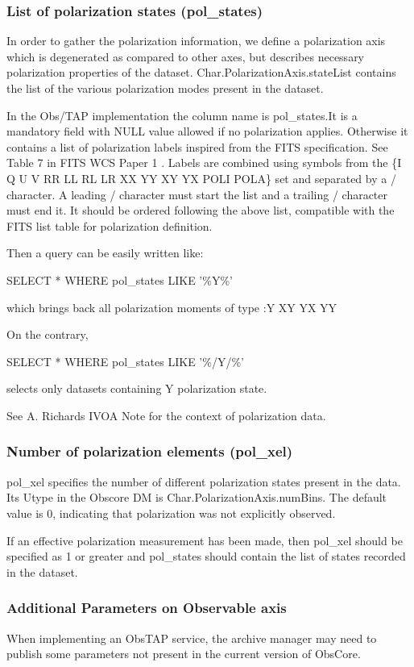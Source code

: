 \documentclass[11pt,a4paper]{ivoa}
\begin{document}
\subsubsection{List of polarization states (pol\_states)}
In order to gather the polarization information, we define a polarization axis which is degenerated as compared to other
axes, but describes necessary polarization properties of the dataset. Char.PolarizationAxis.stateList contains the list
of the various polarization modes present in the dataset. 

In the Obs/TAP implementation the column name is pol\_states.It is a mandatory field with NULL value allowed if no
polarization applies. Otherwise it contains a list of polarization labels inspired from the FITS specification. See
Table 7 in FITS WCS Paper 1 \cite{CITATIONGrel1036} . Labels are combined using symbols from the \{I Q U V RR LL RL LR
XX YY XY YX POLI POLA\} set and separated by a / character. A leading / character must start the list and a trailing /
character must end it. It should be ordered following the above list, compatible with the FITS list table for
polarization definition.

Then a query can be easily written like:

SELECT * WHERE pol\_states LIKE '\%Y\%' 

which brings back all polarization moments of type :Y XY YX YY 

On the contrary, 

SELECT * WHERE pol\_states LIKE '\%/Y/\%' 

selects only datasets containing Y polarization state.

See A. Richards IVOA Note for the context of polarization data\cite{CITATIONRic10l1036}. 

\subsubsection{Number of polarization elements (pol\_xel)}
pol\_xel specifies the number of different polarization states present in the data. Its Utype in the Obscore DM is
Char.PolarizationAxis.numBins. The default value is 0, indicating that polarization was not explicitly observed.

If an effective polarization measurement has been made, then pol\_xel should be specified as 1 or greater and 
pol\_states should contain the list of states recorded in the dataset.

\subsubsection{Additional Parameters on Observable axis}
When implementing an ObsTAP service, the archive manager may need to publish some parameters not present in the current
version of ObsCore.
\end{document}
